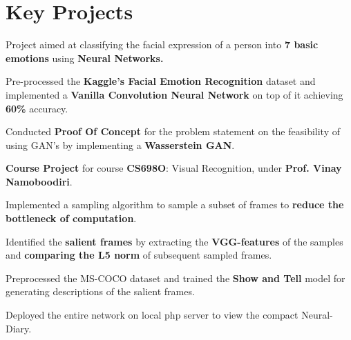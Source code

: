 \documentclass[a4paper]{norm-resume}
\begin{document}
\vspace{1mm}	%


\section{Key Projects}

    \vspace{0.45mm}
    \begin{tightitemize}
	\small
	{
	\item Project aimed at classifying the facial expression of a person into \textbf{7 basic emotions} using \textbf{Neural Networks.}
	\item Pre-processed the \textbf{Kaggle's Facial Emotion Recognition} dataset and implemented a \textbf{Vanilla Convolution Neural Network} on top of it achieving \textbf{60\%} accuracy.
	\item Conducted \textbf{Proof Of Concept} for the problem statement on the feasibility of using GAN's by implementing a \textbf{Wasserstein GAN}.
	}
	\end{tightitemize}
    \vspace{2mm}

				
	\vspace{0.45mm}
	\begin{tightitemize}
	\small
	{
	\item \textbf{Course Project} for course \textbf{CS698O}: Visual Recognition, under \textbf{Prof. Vinay Namoboodiri}.
    \item Implemented a sampling algorithm to sample a subset of frames to \textbf{reduce the bottleneck of computation}.
    \item Identified the \textbf{salient frames} by extracting the \textbf{VGG-features} of the samples and \textbf{comparing the L5 norm} of subsequent sampled frames.
    \item Preprocessed the MS-COCO dataset and trained the \textbf{Show and Tell} model for generating descriptions of the salient frames.
    \item Deployed the entire network on local php server to view the compact Neural-Diary.
	}
	\end{tightitemize}
		
	\vspace{2mm}
	
\end{document}
